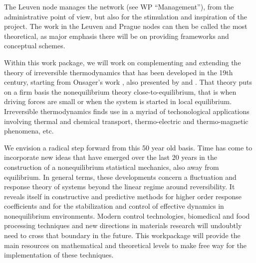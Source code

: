 \begin{workpackage}[id=WPcore,wphases=0-48,
  short=Gen. Theory, %
  title=General Theory, %
  lead=KUL,
  KULRM=36,UNIPDRM=6]

\newrefsection

\begin{wpobjectives}

\end{wpobjectives}

\begin{wpdescription}

The Leuven node manages the network (see WP ``Management''), from the administrative point
of view, but also for the stimulation and inspiration of the project. The work in the Leuven
and Prague nodes can then be called the most theoretical, as major emphasis there will be on
providing frameworks and conceptual schemes.

Within this work package, we will work on complementing and extending the theory of
irreversible thermodynamics that has been developed in the 19th century, starting from
Onsager's work \cite{onsager1,onsager2}, also presented by \cite{degrootmazur} and \cite{kubo}.
%
That theory puts on a firm basis the nonequilibrium theory close-to-equilibrium, that is
when driving forces are small or when the system is started in local equilibrium.
%
Irreversible thermodynamics finds use in a myriad of techonological applications involving
thermal and chemical transport, thermo-electric and thermo-magnetic phenomena, etc.

We envision a radical step forward from this 50 year old basis. Time has come to incorporate
new ideas that have emerged over the last 20 years in the construction of a nonequilibrium
statistical mechanics, also away from equilibrium.
%
In general terms, these developments concern a fluctuation and response theory of systems
beyond the linear regime around reversibility. It reveals itself in constructive and
predictive methods for higher order response coefficients and for the stabilization and
control of effective dynamics in nonequilibrium environments.
%
Modern control technologies, biomedical and food processing techniques and new directions in
materials research will undoubtly need to cross that boundary in the future. This
workpackage will provide the main resources on mathematical and theoretical levels to make
free way for the implementation of these techniques.


\end{wpdescription}
\end{workpackage}

